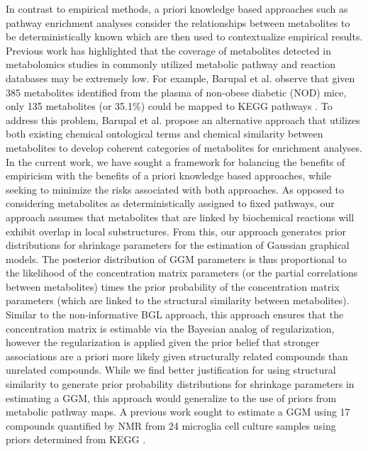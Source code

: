 \begin{DoubleSpace*}
In contrast to empirical methods, a priori knowledge based approaches such as pathway enrichment analyses consider the relationships between metabolites to be deterministically known which are then used to contextualize empirical results. Previous work \cite{barupal2012,barupal2017} has highlighted that the coverage of metabolites detected in metabolomics studies in commonly utilized metabolic pathway and reaction databases may be extremely low. For example, Barupal et al. \cite{barupal2017} observe that given 385 metabolites identified from the plasma of non-obese diabetic (NOD) mice, only 135 metabolites (or 35.1\%) could be mapped to KEGG pathways \cite{kanehisa2000,kanehisa2016}. To address this problem, Barupal et al. \cite{barupal2017} propose an alternative approach that utilizes both existing chemical ontological terms and chemical similarity between metabolites to develop coherent categories of metabolites for enrichment analyses. In the current work, we have sought a framework for balancing the benefits of empiricism with the benefits of a priori knowledge based approaches, while seeking to minimize the risks associated with both approaches. As opposed to considering metabolites as deterministically assigned to fixed pathways, our approach assumes that metabolites that are linked by biochemical reactions will exhibit overlap in local substructures. From this, our approach generates prior distributions for shrinkage parameters for the estimation of Gaussian graphical models. The posterior distribution of GGM parameters is thus proportional to the likelihood of the concentration matrix parameters (or the partial correlations between metabolites) times the prior probability of the concentration matrix parameters (which are linked to the structural similarity between metabolites). Similar to the non-informative BGL approach, this approach ensures that the concentration matrix is estimable via the Bayesian analog of regularization, however the regularization is applied given the prior belief that stronger associations are a priori more likely given structurally related compounds than unrelated compounds. While we find better justification for using structural similarity to generate prior probability distributions for shrinkage parameters in estimating a GGM, this approach would generalize to the use of priors from metabolic pathway maps. A previous work sought to estimate a GGM using 17 compounds quantified by NMR from 24 microglia cell culture samples using priors determined from KEGG \cite{peterson2013}.


\end{DoubleSpace*}
